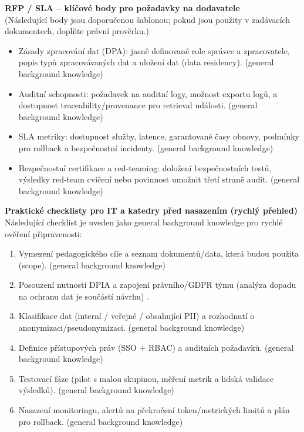\medskip

\textbf{RFP / SLA – klíčové body pro požadavky na dodavatele} \\
(Následující body jsou doporučenou šablonou; pokud jsou použity v zadávacích dokumentech, doplňte právní prověrku.)
\begin{itemize}
  \item Zásady zpracování dat (DPA): jasně definované role správce a zpracovatele, popis typů zpracovávaných dat a uložení dat (data residency). (general background knowledge)
  \item Auditní schopnosti: požadavek na auditní logy, možnost exportu logů, a dostupnost traceability/provenance pro retrieval události. (general background knowledge)
  \item SLA metriky: dostupnost služby, latence, garantované časy obnovy, podmínky pro rollback a bezpečnostní incidenty. (general background knowledge)
  \item Bezpečnostní certifikace a red‑teaming: doložení bezpečnostních testů, výsledky red‑team cvičení nebo povinnost umožnit třetí straně audit. (general background knowledge)
\end{itemize}

\medskip

\textbf{Praktické checklisty pro IT a katedry před nasazením (rychlý přehled)} \\
Následující checklist je uveden jako general background knowledge pro rychlé ověření připravenosti:
\begin{enumerate}
  \item Vymezení pedagogického cíle a seznam dokumentů/data, která budou použita (scope). (general background knowledge)
  \item Posouzení nutnosti DPIA a zapojení právního/GDPR týmu (analýza dopadu na ochranu dat je součástí návrhu) \cite{kb_malinka_chatgpt_ve_vyuce_dva_roky_pote_2024_pdf_90bc3aaf_page_12_1}.
  \item Klasifikace dat (interní / veřejné / obsahující PII) a rozhodnutí o anonymizaci/pseudonymizaci. (general background knowledge)
  \item Definice přístupových práv (SSO + RBAC) a auditních požadavků. (general background knowledge)
  \item Testovací fáze (pilot s malou skupinou, měření metrik a lidská validace výsledků). (general background knowledge)
  \item Nasazení monitoringu, alertů na překročení token/metrických limitů a plán pro rollback. (general background knowledge)
\end{enumerate}

